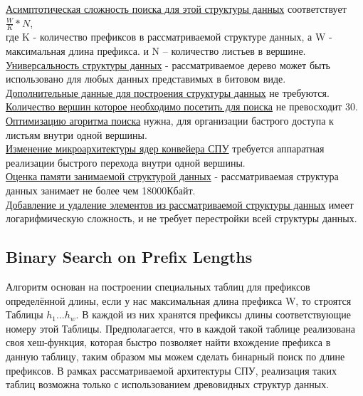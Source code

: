 \documentclass[a4peper, 12pt, titlepage, finall]{extreport}
\begin{document}
            \underline{Асимптотическая сложность поиска для этой структуры данных} соответствует {\ttfamily $\frac{W}{K}*N$},\\
            где {\ttfamily K} - количество префиксов в рассматриваемой структуре данных, а {\ttfamily W} - максимальная длина префикса.
            и {\ttfamily N} -- количество листьев в вершине.\\
            \underline{Универсальность структуры данных} - рассматриваемое дерево может быть использовано для любых данных представимых в битовом виде.\\
            \underline{Дополнительные данные для построения структуры данных} не требуются.\\
            \underline{Количество вершин которое необходимо посетить для поиска} не превосходит 30.\\
            \underline{Оптимизацию агоритма поиска} нужна, для организации бастрого доступа к листьям внутри одной вершины.\\
            \underline{Изменение микроархитектуры ядер конвейера СПУ} требуется аппаратная реализации быстрого перехода внутри одной вершины.\\
            \underline{Оценка памяти занимаемой структурой данных} - рассматриваемая структура данных занимает не более чем 18000Кбайт.\\
            \underline{Добавление и удаление элементов из рассматриваемой структуры данных} имеет логарифмическую сложность, и не требует перестройки всей структуры данных.\\


        \newpage

        \subsection{Binary Search on Prefix Lengths}
            Алгоритм основан на построении специальных таблиц для префиксов определённой длины, если у нас максимальная длина префикса {\ttfamily W}, 
            то строятся Таблицы {\ttfamily $h_{1}...h_{w}$}. В каждой из них хранятся префиксы длины соответствующие номеру этой Таблицы. Предполагается, 
            что в каждой такой таблице реализована своя хеш-функция, которая быстро позволяет найти вхождение префикса в данную таблицу, 
            таким образом мы можем сделать бинарный поиск по длине префиксов. В рамках рассматриваемой архитектуры СПУ, реализация таких таблиц возможна только
            с использованием древовидных структур данных.
\end{document}

